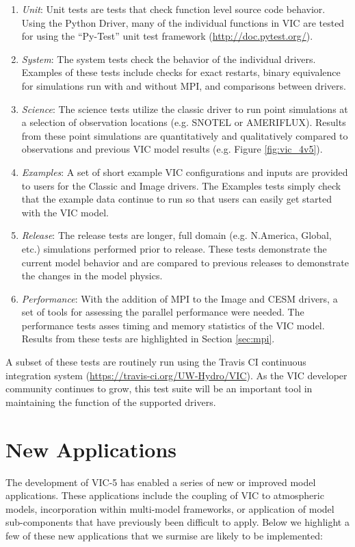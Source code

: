 \documentclass[gmd, manuscript]{copernicus}
\begin{document}
    \begin{enumerate}
      \item \textit{Unit}: Unit tests are tests that check function level source code behavior.
      Using the Python Driver, many of the individual functions in VIC are tested for using the ``Py-Test'' unit test framework (\url{http://doc.pytest.org/}).
      \item \textit{System}: The system tests check the behavior of the individual drivers.
      Examples of these tests include checks for exact restarts, binary equivalence for simulations run with and without MPI, and comparisons between drivers.
      \item \textit{Science}: The science tests utilize the classic driver to run point simulations at a selection of observation locations (e.g. SNOTEL or AMERIFLUX).
      Results from these point simulations are quantitatively and qualitatively compared to observations and previous VIC model results (e.g. Figure \ref{fig:vic_4v5}).
      \item \textit{Examples}: A set of short example VIC configurations and inputs are provided to users for the Classic and Image drivers.
      The Examples tests simply check that the example data continue to run so that users can easily get started with the VIC model.
      \item \textit{Release}: The release tests are longer, full domain (e.g. N.America, Global, etc.) simulations performed prior to release.
      These tests demonstrate the current model behavior and are compared to previous releases to demonstrate the changes in the model physics.
      \item \textit{Performance}: With the addition of MPI to the Image and CESM drivers, a set of tools for assessing the parallel performance were needed.
      The performance tests asses timing and memory statistics of the VIC model.
      Results from these tests are highlighted in Section \ref{sec:mpi}.
    \end{enumerate}

    A subset of these tests are routinely run using the Travis CI continuous integration system (\url{https://travis-ci.org/UW-Hydro/VIC}).
    As the VIC developer community continues to grow, this test suite will be an important tool in maintaining the function of the supported drivers.

\section{New Applications}
  \label{sec:new_apps}
  The development of VIC-5 has enabled a series of new or improved model applications.
  These applications include the coupling of VIC to atmospheric models, incorporation within multi-model frameworks, or application of model sub-components that have previously been difficult to apply.
  Below we highlight a few of these new applications that we surmise are likely to be implemented:
\end{document}

